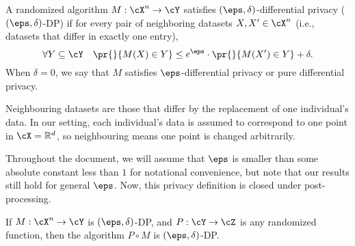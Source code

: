 \begin{definition}
    \label{def:dp}
    A randomized algorithm $M:\cX^n \rightarrow \cY$
    satisfies $(\eps,\delta)$-differential privacy
    ($(\eps,\delta)$-DP) if for every pair of
    neighboring datasets $X,X' \in \cX^n$
    (i.e., datasets that differ in exactly one entry),
    $$\forall Y \subseteq \cY~~~
        \pr{}{M(X) \in Y} \leq e^{\eps}\cdot
        \pr{}{M(X') \in Y} + \delta.$$
    When $\delta = 0$, we say that $M$ satisfies
    $\eps$-differential privacy or pure differential
    privacy.
\end{definition}
Neighbouring datasets are those that differ by the replacement of one individual's data. In our setting, each individual's data is assumed to correspond to one point in $\cX = \mathbb{R}^d$, so neighbouring means one point is changed arbitrarily.

Throughout the document, we will assume that $\eps$ is
smaller than some absolute constant less than $1$ for
notational convenience, but note that our results still
hold for general $\eps$. Now, this privacy definition is
closed under post-processing.
\begin{lemma}\label{lem:post-processing}
    If $M:\cX^n \rightarrow \cY$ is
    $(\eps,\delta)$-DP, and $P:\cY \rightarrow \cZ$
    is any randomized function, then the algorithm
    $P \circ M$ is $(\eps,\delta)$-DP.
\end{lemma}

%

